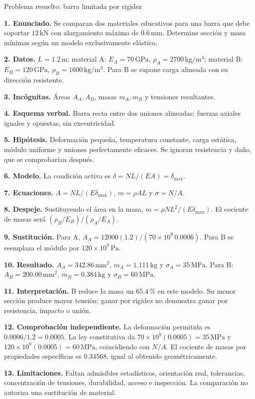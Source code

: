 \begin{studiumworked}{Problema resuelto: barra limitada por rigidez}

\textbf{1. Enunciado.} Se comparan dos materiales educativos para una barra que debe soportar $12\,\mathrm{kN}$ con alargamiento máximo de $0.6\,\mathrm{mm}$. Determine sección y masa mínimas según un modelo exclusivamente elástico.

\textbf{2. Datos.} $L=1.2\,\mathrm{m}$; material A: $E_A=70\,\mathrm{GPa}$, $\rho_A=2700\,\mathrm{kg/m^3}$; material B: $E_B=120\,\mathrm{GPa}$, $\rho_B=1600\,\mathrm{kg/m^3}$. Para B se supone carga alineada con su dirección resistente.

\textbf{3. Incógnitas.} Áreas $A_A,A_B$, masas $m_A,m_B$ y tensiones resultantes.

\textbf{4. Esquema verbal.} Barra recta entre dos uniones alineadas; fuerzas axiales iguales y opuestas, sin excentricidad.

\textbf{5. Hipótesis.} Deformación pequeña, temperatura constante, carga estática, módulo uniforme y uniones perfectamente eficaces. Se ignoran resistencia y daño, que se comprobarían después.

\textbf{6. Modelo.} La condición activa es $\delta=NL/(EA)=\delta_{\max}$.

\textbf{7. Ecuaciones.} $A=NL/(E\delta_{\max})$, $m=\rho AL$ y $\sigma=N/A$.

\textbf{8. Despeje.} Sustituyendo el área en la masa, $m=\rho NL^2/(E\delta_{\max})$. El cociente de masas será $(\rho_B/E_B)/(\rho_A/E_A)$.

\textbf{9. Sustitución.} Para A, $A_A=12000(1.2)/(70\times10^9\,0.0006)$. Para B se reemplaza el módulo por $120\times10^9\,\mathrm{Pa}$.

\textbf{10. Resultado.} $A_A=342.86\,\mathrm{mm^2}$, $m_A=1.111\,\mathrm{kg}$ y $\sigma_A=35\,\mathrm{MPa}$. Para B: $A_B=200.00\,\mathrm{mm^2}$, $m_B=0.384\,\mathrm{kg}$ y $\sigma_B=60\,\mathrm{MPa}$.

\textbf{11. Interpretación.} B reduce la masa un $65.4\,\text{\%}$ en este modelo. Su menor sección produce mayor tensión; ganar por rigidez no demuestra ganar por resistencia, impacto o unión.

\textbf{12. Comprobación independiente.} La deformación permitida es $0.0006/1.2=0.0005$. La ley constitutiva da $70\times10^9(0.0005)=35\,\mathrm{MPa}$ y $120\times10^9(0.0005)=60\,\mathrm{MPa}$, coincidiendo con $N/A$. El cociente de masas por propiedades específicas es $0.34568$, igual al obtenido geométricamente.

\textbf{13. Limitaciones.} Faltan admisibles estadísticos, orientación real, tolerancias, concentración de tensiones, durabilidad, acceso e inspección. La comparación no autoriza una sustitución de material.


\end{studiumworked}

